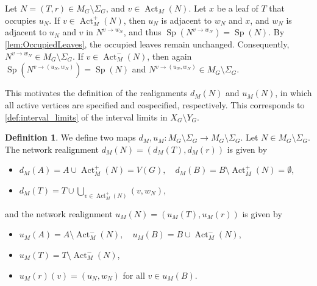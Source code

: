 \documentclass[reqno,dvipsnames]{amsart}
\theoremstyle{plain}
\numberwithin{equation}{section}
\theoremstyle{definition}
\newtheorem{definition}[theorem]{Definition}
\DeclareMathOperator{\Act}{Act}
\DeclareMathOperator{\Sp}{Sp}
\begin{document}
Let $N=(T,r)\in M_G\setminus \Sigma_G$, and $v\in \Act_M(N)$. Let $x$ be a leaf of $T$ that occupies $u_N$. If $v\in \Act_M^+(N)$, then $u_N$ is adjacent to $w_N$ and $x$, and $w_N$ is adjacent to $u_N$ and $v$ in $N^{v\to w_N}$, and thus $\Sp(N^{v\to w_N}) = \Sp(N)$. By \autoref{lem:OccupiedLeaves}, the occupied leaves remain unchanged. Consequently, $N^{v\to w_N} \in M_G\setminus \Sigma_G$. If $v\in \Act_M^-(N)$, then again $\Sp(N^{v\to (u_N,w_N)}) = \Sp(N)$ and $N^{v\to (u_N,w_N)} \in M_G\setminus \Sigma_G$.

This motivates the definition of the realignments $d_M(N)$ and $u_M(N)$, in which all active vertices are specified and cospecified, respectively. This corresponds to \autoref{def:interval_limits} of the interval limits in $X_G\setminus Y_G$.

\begin{definition}
	We define two maps $d_M, u_M\colon M_G\setminus \Sigma_G\rightarrow M_G\setminus \Sigma_G$. Let $N\in M_G\setminus \Sigma_G$. The network realignment $d_M(N)=(d_M(T),d_M(r))$ is given by
	\begin{itemize}
		\item $d_M(A) = A\cup \Act_M^+(N) = V(G), \quad d_M(B) = B\setminus \Act_M^+(N) = \emptyset$,
		\item $d_M(T) = T\cup \bigcup\limits_{v\in \Act_M^+(N)} (v,w_N)$,
	\end{itemize}
	and the network realignment $u_M(N)=(u_M(T),u_M(r))$ is given by
	\begin{itemize}
		\item $u_M(A) = A\setminus \Act_M^-(N), \quad u_M(B) = B\cup \Act_M^-(N)$,
		\item $u_M(T) = T \setminus \Act_M^-(N)$,
		\item  $u_M(r)(v) = (u_N,w_N)$ for all $v\in u_M(B)$.
	\end{itemize}
\end{definition}
\end{document}

